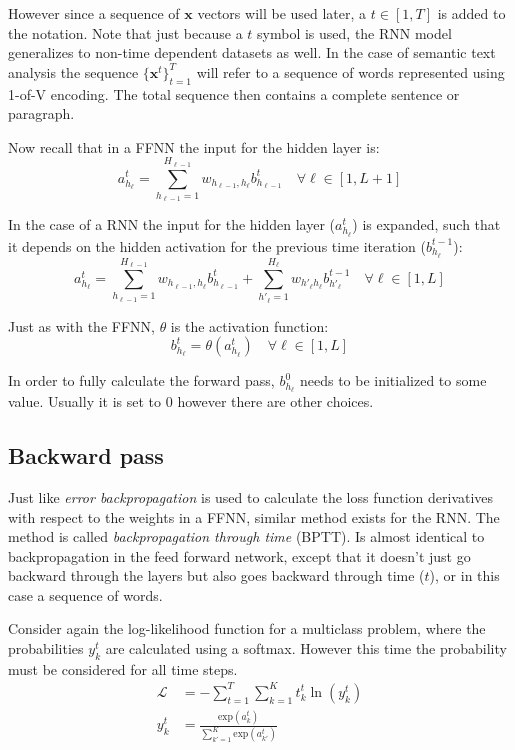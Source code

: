 However since a sequence of $\mathbf{x}$ vectors will be used later, a $t \in [1, T]$ is added to the notation. Note that just because a $t$ symbol is used, the RNN model generalizes to non-time dependent datasets as well. In the case of semantic text analysis the sequence $\{\mathbf{x}^t\}_{t=1}^T$ will refer to a sequence of words represented using 1-of-V encoding. The total sequence then contains a complete sentence or paragraph. 

Now recall that in a FFNN the input for the hidden layer is:
\begin{equation}
a_{h_\ell}^t = \sum_{h_{\ell-1}=1}^{H_{\ell-1}} w_{h_{\ell-1}, h_\ell} b_{h_{\ell-1}}^t \quad \forall \ell \in [1, L+1]
\end{equation}

In the case of a RNN the input for the hidden layer ($a_{h_\ell}^t$) is expanded, such that it depends on the hidden activation for the previous time iteration ($b_{h_\ell}^{t-1}$):
\begin{equation}
a_{h_\ell}^t = \sum_{h_{\ell-1}=1}^{H_{\ell-1}} w_{h_{\ell-1}, h_\ell} b_{h_{\ell-1}}^t + \sum_{h'_\ell=1}^{H_\ell} w_{h'_\ell h_\ell} b_{h'_\ell}^{t-1} \quad \forall \ell \in [1, L]
\end{equation}

Just as with the FFNN, $\theta$ is the activation function:
\begin{equation}
b_{h_\ell}^t = \theta(a_{h_\ell}^t) \quad \forall \ell \in [1, L]
\end{equation}

In order to fully calculate the forward pass, $b_{h_\ell}^0$ needs to be initialized to some value. Usually it is set to $0$ however there are other choices.

\subsection{Backward pass}

Just like \textit{error backpropagation} is used to calculate the loss function derivatives with respect to the weights in a FFNN, similar method exists for the RNN. The method is called \textit{backpropagation through time} (BPTT). Is almost identical to backpropagation in the feed forward network, except that it doesn't just go backward through the layers but also goes backward through time ($t$), or in this case a sequence of words. \cite{alexgraves}

Consider again the log-likelihood function for a multiclass problem, where the probabilities $y_k^t$ are calculated using a softmax. However this time the probability must be considered for all time steps.
\begin{align}
\mathcal{L} &= - \sum_{t=1}^T \sum_{k=1}^K t_k^t \ln(y_k^t) \\
y_k^t &= \frac{\mathrm{exp}(a_k^t)} {\sum_{k'=1}^K \mathrm{exp}(a_{k'}^t)}
\end{align}

